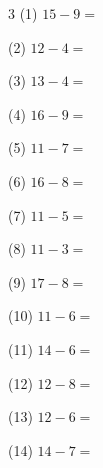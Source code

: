 \documentclass[a4paper, 11pt]{ltjsarticle}
\begin{document}
\hfill

\vspace*{2ex}

\vspace*{5ex}

\begin{multicols*}{3}
\noindent (1) \quad $15 - 9 =$
\vspace*{\fill}

\noindent (2) \quad $12 - 4 =$
\vspace*{\fill}

\noindent (3) \quad $13 - 4 =$
\vspace*{\fill}

\noindent (4) \quad $16 - 9 =$
\vspace*{\fill}

\noindent (5) \quad $11 - 7 =$
\vspace*{\fill}

\noindent (6) \quad $16 - 8 =$
\vspace*{\fill}

\noindent (7) \quad $11 - 5 =$
\vspace*{\fill}

\noindent (8) \quad $11 - 3 =$
\vspace*{\fill}

\noindent (9) \quad $17 - 8 =$
\vspace*{\fill}

\noindent (10) \quad $11 - 6 =$
\vspace*{\fill}

\noindent (11) \quad $14 - 6 =$
\vspace*{\fill}

\noindent (12) \quad $12 - 8 =$
\vspace*{\fill}
\columnbreak

\noindent (13) \quad $12 - 6 =$
\vspace*{\fill}

\noindent (14) \quad $14 - 7 =$
\vspace*{\fill}


\end{multicols*}
\end{document}
